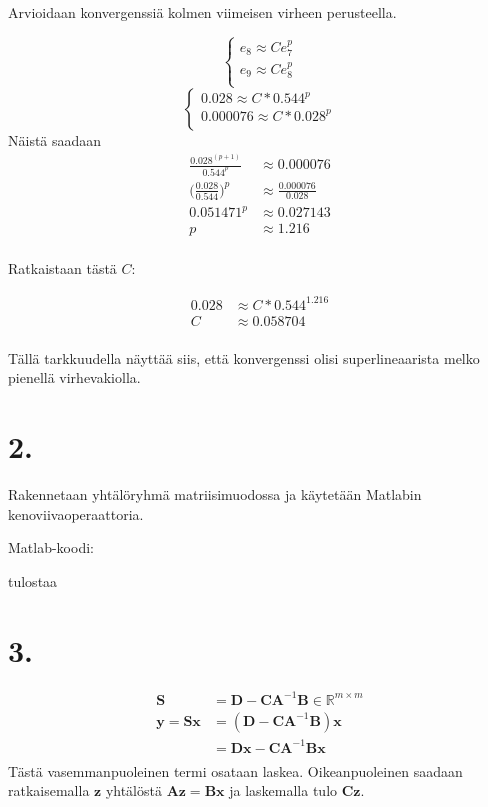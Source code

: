 \documentclass{article}
\begin{document}
Arvioidaan konvergenssiä kolmen viimeisen virheen perusteella.

\[
  \begin{cases}
    e_8 \approx Ce_7^p \\
    e_9 \approx Ce_8^p \\
  \end{cases}
\]
\[
  \begin{cases}
    0.028 \approx C*0.544^p \\
    0.000076 \approx C*0.028^p \\
  \end{cases}
\]
Näistä saadaan
\begin{align*}
  \frac{0.028^{(p+1)}}{0.544^p} &\approx 0.000076 \\
  \Big(\frac{0.028}{0.544}\Big)^p &\approx \frac{0.000076}{0.028} \\
  0.051471^p &\approx 0.027143 \\
  p &\approx 1.216 \\
\end{align*}

Ratkaistaan tästä $C$:

\begin{align*}
  0.028 &\approx C*0.544^{1.216} \\
  C &\approx 0.058704 \\
\end{align*}

Tällä tarkkuudella näyttää siis, että konvergenssi olisi superlineaarista
melko pienellä virhevakiolla.

\section*{2.}

Rakennetaan yhtälöryhmä matriisimuodossa ja käytetään Matlabin kenoviivaoperaattoria.

Matlab-koodi:



tulostaa




\section*{3.}

\begin{align*}
  \mathbf{S} &= \mathbf{D} - \mathbf{CA}^{-1} \mathbf{B} \in \mathbb{R}^{m \times m} \\
  \mathbf{y} = \mathbf{Sx} &= (\mathbf{D} - \mathbf{CA}^{-1} \mathbf{B})\mathbf{x} \\
                       &= \mathbf{Dx} - \mathbf{CA}^{-1}\mathbf{Bx} \\
\end{align*}
Tästä vasemmanpuoleinen termi osataan laskea.
Oikeanpuoleinen saadaan ratkaisemalla $\mathbf{z}$ yhtälös\-tä
$\mathbf{Az} = \mathbf{Bx}$ ja laskemalla tulo $\mathbf{Cz}$.
\end{document}
